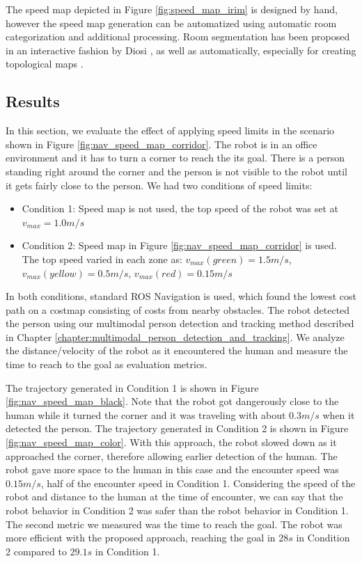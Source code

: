 The speed map depicted in Figure \ref{fig:speed_map_irim} is designed by hand, however the speed map generation can be automatized using automatic room categorization and additional processing. Room segmentation has been proposed in an interactive fashion by Diosi \cite{diosi2005interactive}, as well as automatically, especially for creating topological maps \cite{mozos2007supervised}.

\subsection{Results}
\label{sec:navigation_speed_maps_results}

In this section, we evaluate the effect of applying speed limits in the scenario shown in Figure \ref{fig:nav_speed_map_corridor}. The robot is in an office environment and it has to turn a corner to reach the its goal. There is a person standing right around the corner and the person is not visible to the robot until it gets fairly close to the person. We had two conditions of speed limits:

\begin{itemize}
\item Condition 1: Speed map is not used, the top speed of the robot was set at $v_{max}=1.0m/s$
\item Condition 2: Speed map in Figure \ref{fig:nav_speed_map_corridor} is used. The top speed varied in each zone as: $v_{max}(green)=1.5m/s$, $v_{max}(yellow)=0.5m/s$, $v_{max}(red)=0.15m/s$
\end{itemize}

In both conditions, standard ROS Navigation is used, which found the lowest cost path on a costmap consisting of costs from nearby obstacles. The robot detected the person using our multimodal person detection and tracking method described in Chapter \ref{chapter:multimodal_person_detection_and_tracking}. We analyze the distance/velocity of the robot as it encountered the human and measure the time to reach to the goal as evaluation metrics.

The trajectory generated in Condition 1 is shown in Figure \ref{fig:nav_speed_map_black}. Note that the robot got dangerously close to the human while it turned the corner and it was traveling with about $0.3m/s$ when it detected the person. The trajectory generated in Condition 2 is shown in Figure \ref{fig:nav_speed_map_color}. With this approach, the robot slowed down as it approached the corner, therefore allowing earlier detection of the human. The robot gave more space to the human in this case and the encounter speed was  $0.15m/s$, half of the encounter speed in Condition 1. Considering the speed of the robot and distance to the human at the time of encounter, we can say that the robot behavior in Condition 2 was safer than the robot behavior in Condition 1. The second metric we measured was the time to reach the goal. The robot was more efficient with the proposed approach, reaching the goal in $28s$ in Condition 2 compared to $29.1s$ in Condition 1.



